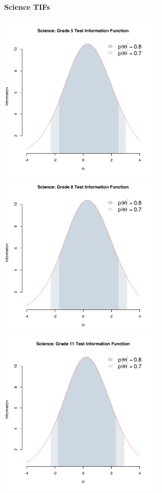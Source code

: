 \documentclass[]{article}
\let\oldparagraph\paragraph
\renewcommand{\paragraph}[1]{\oldparagraph{#1}\mbox{}}
\begin{document}
\hypertarget{science-tifs}{%
\paragraph{Science TIFs}\label{science-tifs}}

\FloatBarrier

\includegraphics[width=\textwidth,height=3.125in]{tifs/science5tif.pdf}
\includegraphics[width=\textwidth,height=3.125in]{tifs/science8tif.pdf}
\includegraphics[width=\textwidth,height=3.125in]{tifs/science11tif.pdf}
\end{document}
